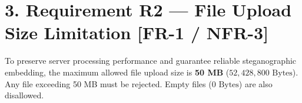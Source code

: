 \documentclass[11pt,a4paper]{article}
\begin{document}
\newpage

\section*{3. Requirement R2 --- File Upload Size Limitation [FR-1 / NFR-3]}
To preserve server processing performance and guarantee reliable steganographic embedding, the maximum allowed file upload size is \textbf{50 MB} ($52{,}428{,}800\text{ Bytes}$). Any file exceeding 50 MB must be rejected. Empty files ($0\text{ Bytes}$) are also disallowed.

\vspace{0.5em}
\end{document}
